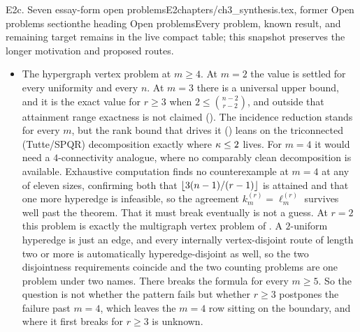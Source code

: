 \begin{offcut}{E2c. Seven essay-form open problems}{E2}{chapters/ch3\_synthesis.tex, former Open problems section}{the heading Open problems}{Every problem, known result, and remaining target remains in the live compact table; this snapshot preserves the longer motivation and proposed routes.}
\begin{itemize}
    \item The hypergraph vertex problem at $m \ge 4$. At $m=2$ the value is settled for every uniformity and every $n$. At $m=3$ there is a universal upper bound, and it is the exact value for $r\ge3$ when $2\le\binom{n-2}{r-2}$, and outside that attainment range exactness is not claimed (). The incidence reduction stands for every $m$, but the rank bound that drives it () leans on the triconnected (Tutte/SPQR) decomposition exactly where $\kappa \le 2$ lives. For $m = 4$ it would need a $4$-connectivity analogue, where no comparably clean decomposition is available. Exhaustive computation finds no counterexample at $m = 4$ at any of eleven sizes, confirming both that $\left\lfloor 3(n-1)/(r-1) \right\rfloor$ is attained and that one more hyperedge is infeasible, so the agreement $k_m^{(r)} = \ell_m^{(r)}$ survives well past the theorem. That it must break eventually is not a guess. At $r = 2$ this problem is exactly the multigraph vertex problem of . A $2$-uniform hyperedge is just an edge, and every internally vertex-disjoint route of length two or more is automatically hyperedge-disjoint as well, so the two disjointness requirements coincide and the two counting problems are one problem under two names. There  breaks the formula for every $m \ge 5$. So the question is not whether the pattern fails but whether $r \ge 3$ postpones the failure past $m = 4$, which leaves the $m = 4$ row sitting on the boundary, and where it first breaks for $r \ge 3$ is unknown.

\end{itemize}
\end{offcut}
